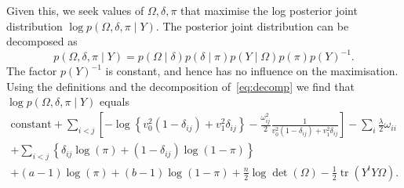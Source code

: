 \documentclass[a4paper, 11pt, oneside]{report}
\DeclareMathOperator{\tr}{tr}
\newcommand{\1}{\mathds{1}}
\newcommand{\inv}{^{-1}}
\begin{document}
Given this, we seek values of $\Omega, \delta, \pi$ that
maximise the log posterior joint distribution $\log p(\Omega, \delta, \pi \mid
	Y)$. The posterior joint distribution can be
decomposed as
\begin{equation}\label{eq:decomp}
	p(\Omega, \delta, \pi \mid Y) = p(\Omega \mid \delta) p(\delta \mid \pi) p(Y \mid
	\Omega) p(\pi) p(Y)\inv.
\end{equation}
The factor $p(Y)\inv$ is constant, and hence has no influence on the
maximisation. Using the definitions and the decomposition of~\eqref{eq:decomp} we find that
$\log p(\Omega, \delta, \pi \mid Y)$ equals
\begin{multline}\label{eq:joint}
	\text{constant} + \sum_{i<j} \left[-\log\left\{v_0^2 (1 - \delta_{ij}) +
	v_1^2 \delta_{ij}\right\} - \frac{\omega^2_{ij}}{2} \frac{1}{v_0^2 (1 -
		\delta_{ij}) + v_1^2 \delta_{ij}} \right] - \sum_i \frac{\lambda}{2}
	\omega_{ii}\\
	+ \sum_{i < j} \left\{\delta_{ij} \log(\pi) + (1 - \delta_{ij})\log(1 - \pi)\right\}                                                                                                                \\
	+ (a-1) \log(\pi) + (b-1)\log(1 - \pi) + \frac{n}{2} \log\det(\Omega) -\frac{1}{2}\tr (Y^t Y \Omega).
\end{multline}
\end{document}
